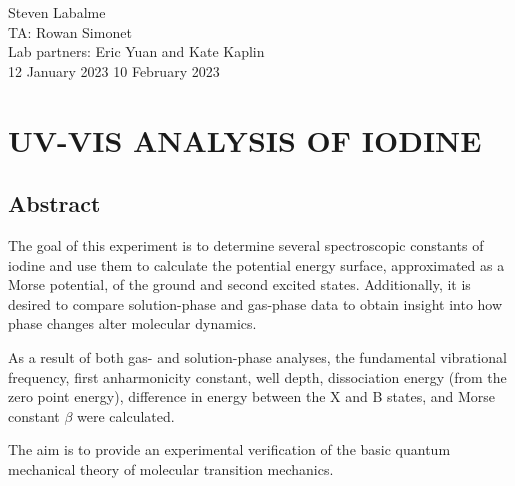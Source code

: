 \documentclass[../labs.tex]{subfiles}
\begin{document}
\noindent Steven Labalme\\
TA: Rowan Simonet\\
Lab partners: Eric Yuan and Kate Kaplin\\
12 January 2023\hfill
10 February 2023

\section{UV-VIS ANALYSIS OF IODINE}
\subsection*{Abstract}

The goal of this experiment is to determine several spectroscopic constants of iodine and use them to calculate the potential energy surface, approximated as a Morse potential, of the ground and second excited states. Additionally, it is desired to compare solution-phase and gas-phase data to obtain insight into how phase changes alter molecular dynamics.\par
As a result of both gas- and solution-phase analyses, the fundamental vibrational frequency, first anharmonicity constant, well depth, dissociation energy (from the zero point energy), difference in energy between the X and B states, and Morse constant $\beta$ were calculated.\par
The aim is to provide an experimental verification of the basic quantum mechanical theory of molecular transition mechanics.
\end{document}
